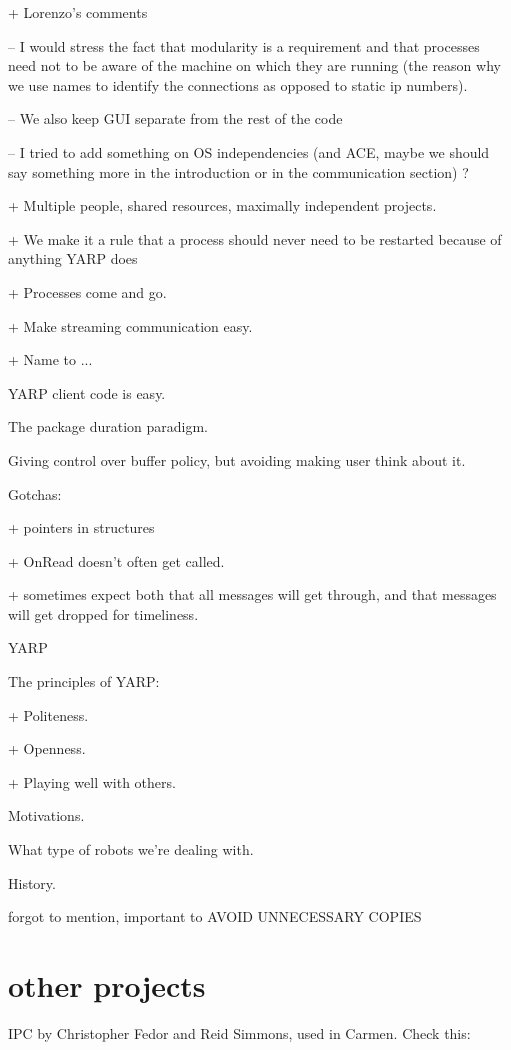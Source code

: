 
+ Lorenzo's comments

-- I would stress the fact that modularity is a requirement and that processes need not to be aware of the machine on which they are running (the reason why we use names to identify the connections as opposed to static ip numbers).

-- We also keep GUI separate from the rest of the code

-- I tried to add something on OS independencies (and ACE, maybe we should say something more in the introduction or in the communication section) ?

+ Multiple people, shared resources, maximally independent projects.

+ We make it a rule that a process should never need to be restarted
  because of anything YARP does

+ Processes come and go.

+ Make streaming communication easy.

+ Name to ...




YARP client code is easy.

The package duration paradigm.

Giving control over buffer policy, but avoiding making user
think about it.

Gotchas:

+ pointers in structures

+ OnRead doesn't often get called.

+ sometimes expect both that all messages will get through, and
  that messages will get dropped for timeliness.

YARP

The principles of YARP:

+ Politeness.

+ Openness.

+ Playing well with others.

Motivations.

What type of robots we're dealing with.

History.

forgot to mention, important to AVOID UNNECESSARY COPIES

\section{other projects}

IPC by Christopher Fedor and Reid Simmons, used in Carmen.
Check this: \cite{roy03IROS}

